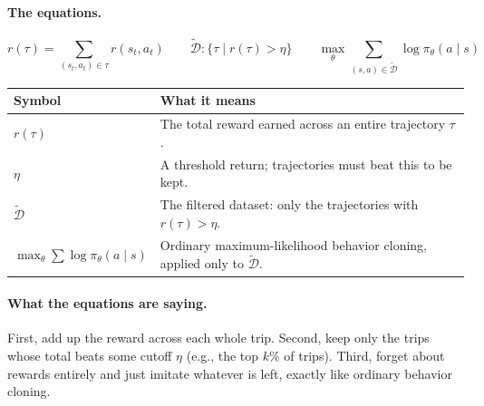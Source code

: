 \documentclass[11pt]{article}
\begin{document}
\paragraph{The equations.}
$$r(\tau) = \sum_{(s_t,a_t)\in\tau} r(s_t,a_t) \qquad
\widetilde{\mathcal{D}} : \{\tau \mid r(\tau) > \eta\} \qquad
\max_\theta \sum_{(s,a)\in\widetilde{\mathcal{D}}} \log \pi_\theta(a\mid s)$$

\begin{center}
\begin{tabular}{@{}p{3.2cm}p{10.3cm}@{}}
\toprule
Symbol & What it means \\
\midrule
$r(\tau)$ & The total reward earned across an entire trajectory $\tau$. \\
$\eta$ & A threshold return; trajectories must beat this to be kept. \\
$\widetilde{\mathcal{D}}$ & The filtered dataset: only the trajectories with
$r(\tau) > \eta$. \\
$\max_\theta \sum \log \pi_\theta(a\mid s)$ & Ordinary maximum-likelihood behavior
cloning, applied only to $\widetilde{\mathcal{D}}$. \\
\bottomrule
\end{tabular}
\end{center}

\paragraph{What the equations are saying.}
First, add up the reward across each whole trip. Second, keep only the trips whose total
beats some cutoff $\eta$ (e.g., the top $k\%$ of trips). Third, forget about rewards
entirely and just imitate whatever is left, exactly like ordinary behavior cloning.
\end{document}
